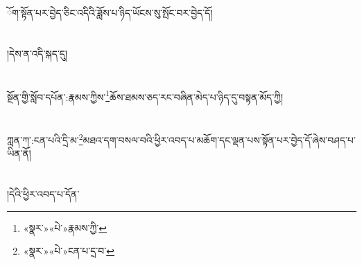 ོག་སྟོན་པར་བྱེད་ཅིང་འདིའི་ཟློས་པ་ཉིད་ཡོངས་སུ་སྤོང་བར་བྱེད་དོ།\chapter{ }།དེས་ན་འདི་སྐད་དུ།\chapter{ }སྔོན་གྱི་སློབ་དཔོན་:རྣམས་ཀྱིས་\footnote{«སྣར་»«པེ་»རྣམས་ཀྱི་}ཆོས་ཐམས་ཅད་རང་བཞིན་མེད་པ་ཉིད་དུ་བསྟན་མོད་ཀྱི།\chapter{ }ཀླན་ཀ་:ངན་པའི་དྲི་མ་\footnote{«སྣར་»«པེ་»ངན་པ་དྲ་བ་}མཐའ་དག་བསལ་བའི་ཕྱིར་འབད་པ་མཆོག་དང་ལྡན་པས་སྟོན་པར་བྱེད་དོ་ཞེས་བཤད་པ་ཡིན་ནོ།\chapter{ }།དེའི་ཕྱིར་འབད་པ་དོན་